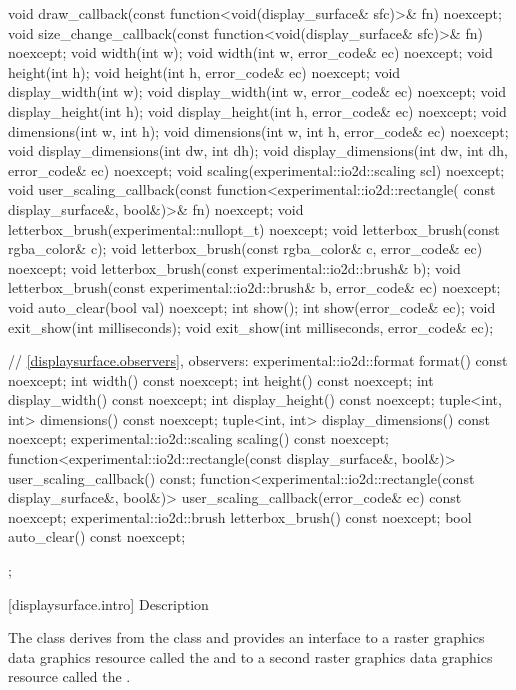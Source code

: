 \begin{codeblock}
{{{{{    void draw_callback(const function<void(display_surface& sfc)>& fn) noexcept;
    void size_change_callback(const function<void(display_surface& sfc)>& fn)
      noexcept;
    void width(int w);
    void width(int w, error_code& ec) noexcept;
    void height(int h);
    void height(int h, error_code& ec) noexcept;
    void display_width(int w);
    void display_width(int w, error_code& ec) noexcept;
    void display_height(int h);
    void display_height(int h, error_code& ec) noexcept;
    void dimensions(int w, int h);
    void dimensions(int w, int h, error_code& ec) noexcept;
    void display_dimensions(int dw, int dh);
    void display_dimensions(int dw, int dh, error_code& ec) noexcept;
    void scaling(experimental::io2d::scaling scl) noexcept;
    void user_scaling_callback(const function<experimental::io2d::rectangle(
      const display_surface&, bool&)>& fn) noexcept;
    void letterbox_brush(experimental::nullopt_t) noexcept;
    void letterbox_brush(const rgba_color& c);
    void letterbox_brush(const rgba_color& c, error_code& ec) noexcept;
    void letterbox_brush(const experimental::io2d::brush& b);
    void letterbox_brush(const experimental::io2d::brush& b, error_code& ec) 
      noexcept;
    void auto_clear(bool val) noexcept;
    int show();
    int show(error_code& ec);
    void exit_show(int milliseconds);
    void exit_show(int milliseconds, error_code& ec);
    
    // \ref{displaysurface.observers}, observers:
    experimental::io2d::format format() const noexcept;
    int width() const noexcept;
    int height() const noexcept;
    int display_width() const noexcept;
    int display_height() const noexcept;
    tuple<int, int> dimensions() const noexcept;
    tuple<int, int> display_dimensions() const noexcept;
    experimental::io2d::scaling scaling() const noexcept;
    function<experimental::io2d::rectangle(const display_surface&,
      bool&)> user_scaling_callback() const;
    function<experimental::io2d::rectangle(const display_surface&,
      bool&)> user_scaling_callback(error_code& ec) const noexcept;
    experimental::io2d::brush letterbox_brush() const noexcept;
    bool auto_clear() const noexcept;
  };
} } } }
\end{codeblock}

 [displaysurface.intro] { Description}

\pnum
{}
The class  derives from the  class and provides an interface to a raster graphics data graphics resource called the  and to a second raster graphics data graphics resource called the .


